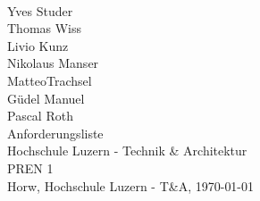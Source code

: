 \begin{titlepage}
    \begin{center}     
        \\
        \vspace*{1.2cm}
        Yves Studer\\
        Thomas Wiss\\
        Livio Kunz\\
        Nikolaus Manser\\
        MatteoTrachsel\\
        Güdel Manuel\\
        Pascal Roth\\
        \vspace*{1.2cm}
        {\Huge Anforderungsliste}\\
        \vspace*{1cm}
        \vspace*{2cm}
        {\normalsize Hochschule Luzern - Technik \& Architektur}\\
        {\normalsize PREN 1}\\
        \vspace*{0.6cm}
        {\normalsize Horw, Hochschule Luzern - T\&A, \today}\\
    \end{center}
\end{titlepage}

